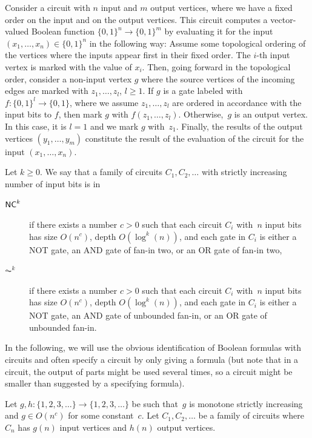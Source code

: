Consider a circuit with $n$ input and $m$ output vertices, where we have a fixed order on the input 
and on the output vertices. This circuit computes
a vector-valued Boolean function $\{0,1\}^n \to \{0,1\}^m$
by evaluating it for the input $(x_1, \ldots, x_n) \in \{0,1\}^n$
in the following way:
Assume some topological ordering of the vertices where the inputs appear first
in their fixed order. The $i$-th input vertex is marked with the value of $x_i$.
Then, going forward in the topological order,
consider a non-input vertex $g$ where the source vertices 
of the incoming edges are marked with $z_1, \ldots, z_l$, $l \ge 1$.
If $g$ is a gate labeled with $f \colon \{0,1\}^l \to \{0,1\}$,
where we assume $z_1, \ldots, z_l$ are ordered in accordance with the input bits to $f$,
then mark $g$ with $f(z_1, \ldots, z_l)$.
Otherwise,~$g$ is an output vertex.
In this case, it is $l = 1$ and we mark $g$ with~$z_1$.
Finally, the results of the output vertices
$(y_1, \ldots, y_m)$ constitute the result of the evaluation 
of the circuit for the input $(x_1, \ldots, x_n)$.

\label{def:AC0circuitclass} 
Let $k \ge 0$. We say that a family of circuits  $C_1, C_2, \ldots$ with strictly increasing number of input bits 
is in
\begin{description}
\item[$\textup{\textsf{NC}}^k$] if there exists a number $c > 0$ such that each circuit $C_i$ with~$n$ input bits has size  $O(n^c)$,
 depth $O(\log^k(n))$,
 and each gate in $C_i$ is either a {\sc NOT} gate,
 an {\sc AND} gate of fan-in two, or an {\sc OR} gate
 of fan-in two,
 	
\item[$\AC^k$]  if there exists a number $c > 0$ such that each circuit $C_i$ with~$n$ input bits has size  $O(n^c)$,
depth $O(\log^k(n))$,
and each gate in $C_i$ is either  a {\sc NOT} gate, an {\sc AND} gate of unbounded fan-in, 
or an {\sc OR} gate of unbounded fan-in.
\end{description}

In the following, we will use the obvious identification of Boolean formulas
with circuits and often specify a circuit by only giving a formula (but note 
that in a circuit, the output of parts might be used several times, 
so a circuit might be smaller than suggested by a specifying formula).

Let $g, h \colon \{1,2,3,\ldots\} \to \{1,2,3,\ldots\}$ 
be such that~$g$ is monotone strictly increasing and $g \in O(n^c)$ for some constant~$c$.
Let $C_1, C_2, \ldots$ be a family of circuits where $C_n$
has $g(n)$ input vertices and $h(n)$ output vertices.


